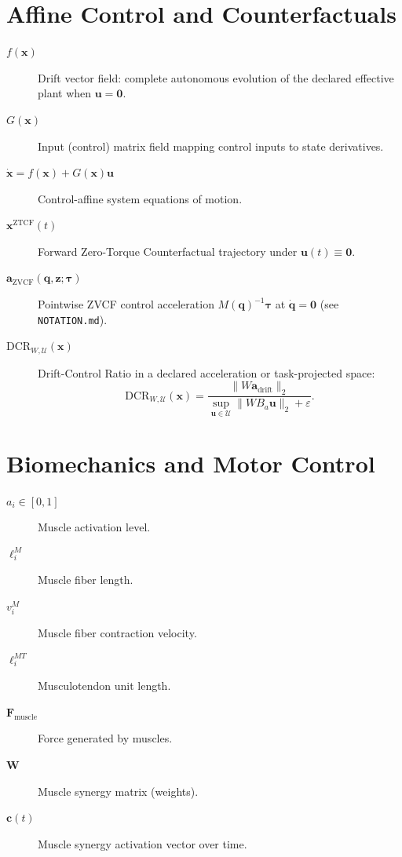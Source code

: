 \section*{Affine Control and Counterfactuals}
\begin{description}
    \item[$f(\mathbf{x})$] Drift vector field: complete autonomous evolution of the declared effective plant when $\mathbf{u} = \mathbf{0}$.
    \item[$G(\mathbf{x})$] Input (control) matrix field mapping control inputs to state derivatives.
    \item[$\dot{\mathbf{x}} = f(\mathbf{x}) + G(\mathbf{x})\mathbf{u}$] Control-affine system equations of motion.
    \item[$\mathbf{x}^{\mathrm{ZTCF}}(t)$] Forward Zero-Torque Counterfactual trajectory under $\mathbf{u}(t) \equiv \mathbf{0}$.
    \item[$\mathbf{a}_{\mathrm{ZVCF}}(\mathbf{q}, \mathbf{z}; \boldsymbol{\tau})$] Pointwise ZVCF control acceleration $M(\mathbf{q})^{-1}\boldsymbol{\tau}$ at $\dot{\mathbf{q}}=\mathbf{0}$ (see \texttt{NOTATION.md}).
    \item[$\mathrm{DCR}_{W,\mathcal{U}}(\mathbf{x})$] Drift-Control Ratio in a declared acceleration or task-projected space:
    \[
      \mathrm{DCR}_{W,\mathcal{U}}(\mathbf{x})
      =\frac{\|W \mathbf{a}_{\mathrm{drift}}\|_2}{\sup_{\mathbf{u}\in\mathcal{U}}\|W B_a \mathbf{u}\|_2 + \varepsilon}.
    \]
\end{description}

\section*{Biomechanics and Motor Control}
\begin{description}
    \item[{$a_i \in [0, 1]$}] Muscle activation level.
    \item[$\ell_i^M$] Muscle fiber length.
    \item[$v_i^M$] Muscle fiber contraction velocity.
    \item[$\ell_i^{MT}$] Musculotendon unit length.
    \item[$\mathbf{F}_{\text{muscle}}$] Force generated by muscles.
    \item[$\mathbf{W}$] Muscle synergy matrix (weights).
    \item[$\mathbf{c}(t)$] Muscle synergy activation vector over time.
\end{description}

